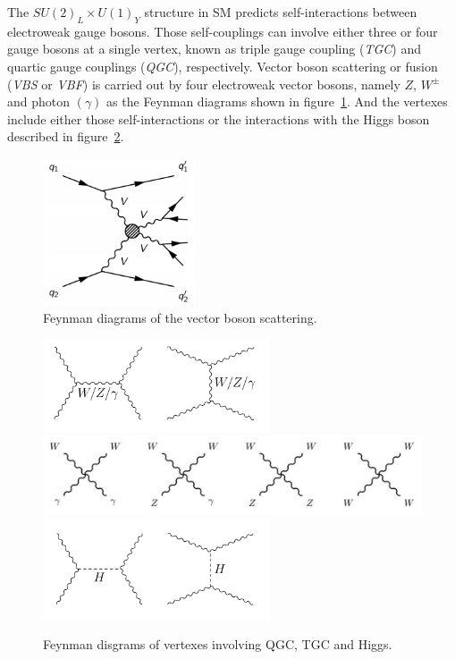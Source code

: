 The $SU(2)_{L} \times U(1)_{Y}$ structure in SM predicts self-interactions between electroweak gauge bosons.
Those self-couplings can involve either three or four gauge bosons at a single vertex, known as triple gauge coupling (\textit{TGC}) and
quartic gauge couplings (\textit{QGC}), respectively.
Vector boson scattering or fusion (\textit{VBS} or \textit{VBF}) is carried out 
by four electroweak vector bosons, namely $Z$, $W^{\pm}$ and photon $(\gamma)$ as the Feynman diagrams shown in figure~\ref{fig:vbs_fd1}. 
And the vertexes include either those self-interactions
or the interactions with the Higgs boson described in figure~\ref{fig:vbs_fd2}.
\begin{figure}[!htb]
  \centering
  \includegraphics[width=0.4\textwidth]{figures/Theory/VBS.png} 
  \caption{Feynman diagrams of the vector boson scattering.}
  \label{fig:vbs_fd1}
\end{figure}
\begin{figure}[!htb]
  \centering
  \includegraphics[width=0.6\textwidth]{figures/Theory/vbs_tgc.png} \\
  \includegraphics[width=1.0\textwidth]{figures/Theory/vbs_qgc.png} \\
  \includegraphics[width=0.6\textwidth]{figures/Theory/vbs_higgs.png} 
  \caption{Feynman disgrams of vertexes involving QGC, TGC and Higgs.}
  \label{fig:vbs_fd2}
\end{figure}


